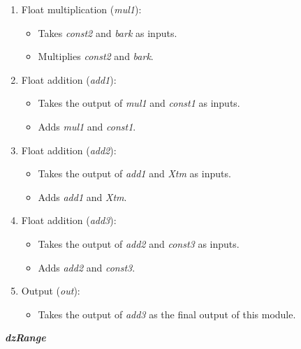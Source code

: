 \documentclass{article}
\begin{document}
\begin{enumerate}

\item Float multiplication (\textit{mul1}):
\begin{itemize}
\item Takes \textit{const2} and \textit{bark} as inputs.
\item Multiplies \textit{const2} and \textit{bark}.
\end{itemize}

\item Float addition (\textit{add1}):
\begin{itemize}
\item Takes the output of \textit{mul1} and \textit{const1} as inputs.
\item Adds \textit{mul1} and \textit{const1}.
\end{itemize}

\item Float addition (\textit{add2}):
\begin{itemize}
\item Takes the output of \textit{add1} and \textit{Xtm} as inputs.
\item Adds \textit{add1} and \textit{Xtm}.
\end{itemize}

\item Float addition (\textit{add3}):
\begin{itemize}
\item Takes the output of \textit{add2} and \textit{const3} as inputs.
\item Adds \textit{add2} and \textit{const3}.
\end{itemize}

\item Output (\textit{out}):
\begin{itemize}
\item Takes the output of \textit{add3} as the final output of this module.
\end{itemize}

\end{enumerate}

\vspace{0.5cm}

\textit{\textbf{dzRange}}
\end{document}
